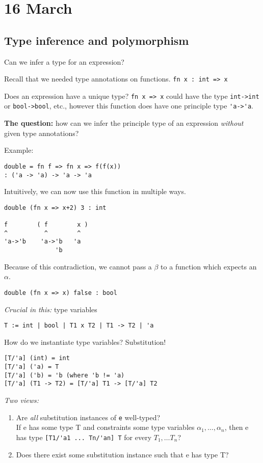 \documentclass[11pt]{article}
\begin{document}
\section{16 March}
\subsection{Type inference and polymorphism}
Can we infer a type for an expression?

Recall that we needed type annotations on functions. \verb~fn x : int => x~

Does an expression have a unique type? \verb~fn x => x~ could have the type \verb~int->int~ or \verb~bool->bool~, etc., however this function does have one principle type \verb~'a->'a~.

\textbf{The question:} how can we infer the principle type of an expression \emph{without} given type annotations?

Example:
\begin{verbatim}
double = fn f => fn x => f(f(x))
: ('a -> 'a) -> 'a -> 'a
\end{verbatim}

Intuitively, we can now use this function in multiple ways.
\begin{verbatim}
double (fn x => x+2) 3 : int

f        ( f        x )
^          ^        ^
'a->'b    'a->'b   'a
              'b
\end{verbatim}
Because of this contradiction, we cannot pass a $\beta$ to a function which expects an $\alpha$.

\begin{verbatim}
double (fn x => x) false : bool
\end{verbatim}

\emph{Crucial in this:} type variables
\begin{verbatim}
T := int | bool | T1 x T2 | T1 -> T2 | 'a
\end{verbatim}
How do we instantiate type variables? Substitution!
\begin{verbatim}
[T/'a] (int) = int
[T/'a] ('a) = T
[T/'a] ('b) = 'b (where 'b != 'a)
[T/'a] (T1 -> T2) = [T/'a] T1 -> [T/'a] T2
\end{verbatim}

\emph{Two views:}
\begin{enumerate}
    \item Are \emph{all} substitution instances of \verb~e~ well-typed? \\
        If e has some type T and constraints some type variables $\alpha_1, \ldots, \alpha_n$, then e has type \verb~[T1/'a1 ... Tn/'an] T~ for every $T_1, \ldots T_n$?
    \item Does there exist some substitution instance such that e has type T?
\end{enumerate}
\end{document}

